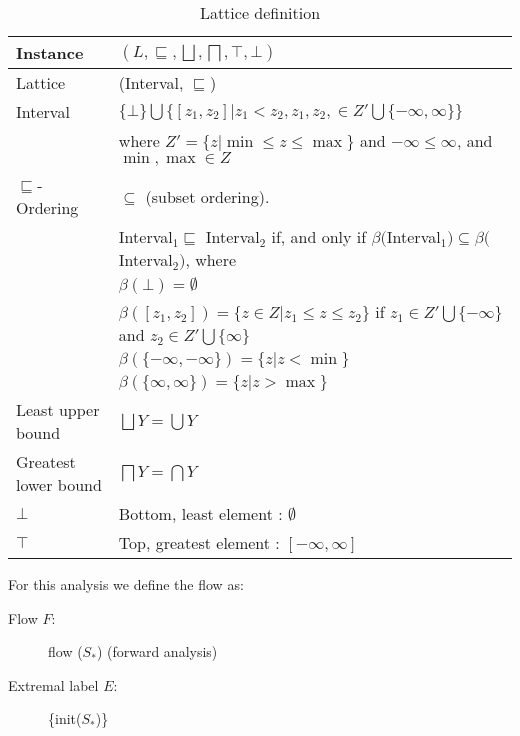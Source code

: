 \begin{table}[H]
\begin{tabular}{| l | l |}
  \hline
  Instance & $(L,\sqsubseteq,\bigsqcup, \bigsqcap, \top, \bot )$ \\
  \hline
  \hline
  Lattice  & (Interval, $\sqsubseteq$) \\
  \hline
  Interval & $\{\bot\} \bigcup \{[z_1, z_2] | z_1 < z_2, z_1, z_2, \in Z' \bigcup \{- \infty, \infty \} \} $ \\
           & where $Z' = \{ z | \min \leq z \leq \max \}$ and $ - \infty \leq \infty $, and $ \min, \max \in Z$ \\
           \hline
   $\sqsubseteq$-Ordering &  $\subseteq$ (subset ordering).\\
                          & Interval$_1 \sqsubseteq $ Interval$_2 $ if, and only if $\beta($Interval$_1) \subseteq \beta($Interval$_2)$, where \\
                          & $\beta(\bot) = \emptyset$ \\
                          & $\beta([z_1, z_2]) = \{ z \in Z | z_1 \leq z \leq z_2\} $ if $z_1 \in Z' \bigcup \{  -\infty\} $ and $ z_2 \in Z' \bigcup \{\infty\}$ \\
                          & $\beta(\{-\infty, -\infty\}) = \{z | z < \min\}$ \\
                          & $\beta(\{\infty, \infty\}) = \{z | z > \max\}$ \\
   \hline
   Least upper bound      & $\bigsqcup Y = \bigcup Y$\\
   \hline
   Greatest lower bound   & $\bigsqcap Y = \bigcap Y$\\
   \hline
   $\bot$                 & Bottom, least element : $\emptyset$\\
   \hline
   $\top$                 & Top, greatest element : $[-\infty, \infty]$\\
\hline   
\end{tabular}
  \centering
  \caption{Lattice definition}
  \label{table:latticedefinition}
\end{table}
\noindent For this analysis we define the flow as:

\begin{description}
  \item[Flow $F$:] flow ($S_*$) (forward analysis)
  \item[Extremal label $E$:] \{init($S_*$)\}
\end{description}

